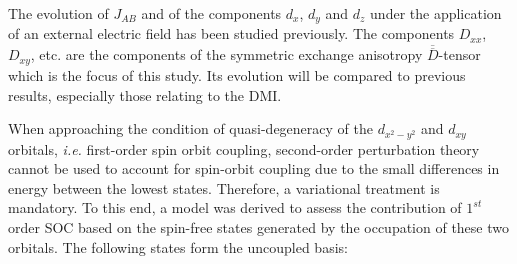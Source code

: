 \documentclass[12pt]{report}
\numberwithin{equation}{section}
\begin{document}
\begin{center}
\end{center}
The evolution of $J_{AB}$ and of the components $d_x$, $d_y$ and $d_z$ under the application of an external electric field has been studied previously.
The components $D_{xx}$, $D_{xy}$, etc. are the components of the symmetric exchange anisotropy $\overline{\overline{D}}$-tensor which is the focus of this study.
Its evolution will be compared to previous results, especially those relating to the DMI.

When approaching the condition of quasi-degeneracy of the $d_{x^2-y^2}$ and $d_{xy}$ orbitals, \textit{i.e.} first-order spin orbit coupling, second-order perturbation theory cannot be used to account for spin-orbit coupling due to the small differences in energy between the lowest states.
Therefore, a variational treatment is mandatory.
To this end, a model was derived to assess the contribution of $1^{st}$ order SOC based on the spin-free states generated by the occupation of these two orbitals.
The following states form the uncoupled basis:
\end{document}
